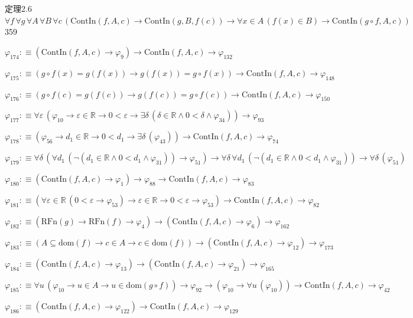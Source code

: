 \begin{fullproof}{定理2.6}{$\forall f\,\forall g\,\forall A\,\forall B\,\forall c\,(\mathrm{ContIn}(f,A,c) \to \mathrm{ContIn}(g,B,f(c)) \to \forall x \in A\,(f(x) \in B) \to \mathrm{ContIn}(g \circ f,A,c))$}{359}
\begin{abbrevlist}
\item $\varphi_{174} :\equiv (\mathrm{ContIn}(f,A,c) \to \varphi_{9}) \to \mathrm{ContIn}(f,A,c) \to \varphi_{132}$
\item $\varphi_{175} :\equiv (g \circ f(x) = g(f(x)) \to g(f(x)) = g \circ f(x)) \to \mathrm{ContIn}(f,A,c) \to \varphi_{148}$
\item $\varphi_{176} :\equiv (g \circ f(c) = g(f(c)) \to g(f(c)) = g \circ f(c)) \to \mathrm{ContIn}(f,A,c) \to \varphi_{150}$
\item $\varphi_{177} :\equiv \forall \varepsilon\,(\varphi_{10} \to \varepsilon \in \mathbb{R} \to 0 < \varepsilon \to \exists \delta\,(\delta \in \mathbb{R} \land 0 < \delta \land \varphi_{34})) \to \varphi_{93}$
\item $\varphi_{178} :\equiv (\varphi_{56} \to d_{1} \in \mathbb{R} \to 0 < d_{1} \to \exists \delta\,(\varphi_{43})) \to \mathrm{ContIn}(f,A,c) \to \varphi_{74}$
\item $\varphi_{179} :\equiv \forall \delta\,(\forall d_{1}\,(\neg (d_{1} \in \mathbb{R} \land 0 < d_{1} \land \varphi_{31})) \to \varphi_{51}) \to \forall \delta\,\forall d_{1}\,(\neg (d_{1} \in \mathbb{R} \land 0 < d_{1} \land \varphi_{31})) \to \forall \delta\,(\varphi_{51})$
\item $\varphi_{180} :\equiv (\mathrm{ContIn}(f,A,c) \to \varphi_{1}) \to \varphi_{88} \to \mathrm{ContIn}(f,A,c) \to \varphi_{83}$
\item $\varphi_{181} :\equiv (\forall \varepsilon \in \mathbb{R}\,(0 < \varepsilon \to \varphi_{53}) \to \varepsilon \in \mathbb{R} \to 0 < \varepsilon \to \varphi_{53}) \to \mathrm{ContIn}(f,A,c) \to \varphi_{82}$
\item $\varphi_{182} :\equiv (\mathrm{RFn}(g) \to \mathrm{RFn}(f) \to \varphi_{4}) \to (\mathrm{ContIn}(f,A,c) \to \varphi_{6}) \to \varphi_{162}$
\item $\varphi_{183} :\equiv (A \subseteq \mathrm{dom}(f) \to c \in A \to c \in \mathrm{dom}(f)) \to (\mathrm{ContIn}(f,A,c) \to \varphi_{12}) \to \varphi_{173}$
\item $\varphi_{184} :\equiv (\mathrm{ContIn}(f,A,c) \to \varphi_{13}) \to (\mathrm{ContIn}(f,A,c) \to \varphi_{21}) \to \varphi_{165}$
\item $\varphi_{185} :\equiv \forall u\,(\varphi_{10} \to u \in A \to u \in \mathrm{dom}(g \circ f)) \to \varphi_{92} \to (\varphi_{10} \to \forall u\,(\varphi_{10})) \to \mathrm{ContIn}(f,A,c) \to \varphi_{42}$
\item $\varphi_{186} :\equiv (\mathrm{ContIn}(f,A,c) \to \varphi_{122}) \to \mathrm{ContIn}(f,A,c) \to \varphi_{129}$

\end{abbrevlist}
\end{fullproof}
